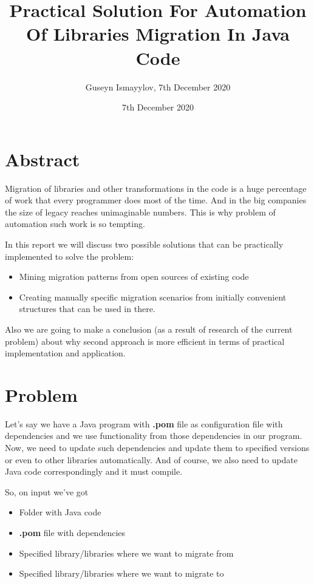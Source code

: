 \documentclass[sigplan,screen,11pt]{acmart}
\title{Practical Solution For Automation Of Libraries Migration In Java Code}
\author{Guseyn Ismayylov, 7th December 2020}
\date{7th December 2020}
\begin{document}
\maketitle

\section{Abstract}

Migration of libraries and other transformations in the code is a huge percentage of work that every programmer does most of the time. And in the big companies the size of legacy reaches unimaginable numbers. This is why problem of automation such work is so tempting.

In this report we will discuss two possible solutions that can be practically implemented to solve the problem: 
\begin{itemize}
  \item Mining migration patterns from open sources of existing code
  \item Creating manually specific migration scenarios from initially convenient structures that can be used in there.
\end{itemize}

Also we are going to make a conclusion (as a result of research of the current problem) about why second approach is more efficient in terms of practical implementation and application.

\section{Problem}

Let's say we have a Java program with \textbf{.pom} file as configuration file with dependencies and we use functionality from those dependencies in our program. Now, we need to update such dependencies and update them to specified versions or even to other libraries automatically. And of course, we also need to update Java code correspondingly and it must compile.

So, on input we've got
\begin{itemize}
  \item Folder with Java code
  \item \textbf{.pom} file with dependencies
  \item Specified library/libraries where we want to migrate from
  \item Specified library/libraries where we want to migrate to
\end{itemize}
\end{document}
